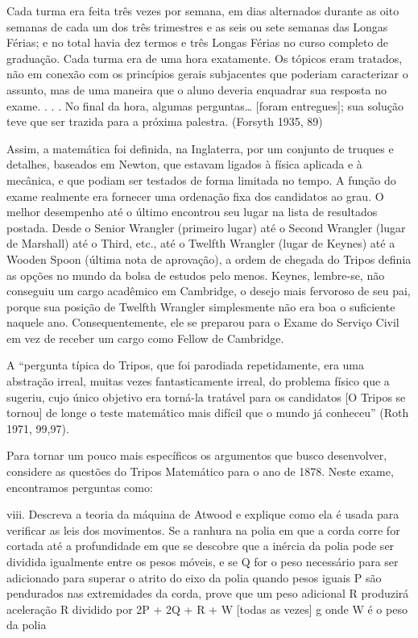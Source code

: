 \documentclass[a4paper,12pt]{article}[abntex2]
\begin{document}
Cada turma era feita três vezes por semana, em dias alternados durante as oito semanas de cada um dos três trimestres e as seis ou sete semanas das Longas Férias; e no total havia dez termos e três Longas Férias no curso completo de graduação. Cada turma era de uma hora exatamente. Os tópicos eram tratados, não em conexão com os princípios gerais subjacentes que poderiam caracterizar o assunto, mas de uma maneira que o aluno deveria enquadrar sua resposta no exame. . . . No final da hora, algumas perguntas… [foram entregues]; sua solução teve que ser trazida para a próxima palestra. (Forsyth 1935, 89)

Assim, a matemática foi definida, na Inglaterra, por um conjunto de truques e detalhes, baseados em Newton, que estavam ligados à física aplicada e à mecânica, e que podiam ser testados de forma limitada no tempo. A função do exame realmente era fornecer uma ordenação fixa dos candidatos ao grau. O melhor desempenho até o último encontrou seu lugar na lista de resultados postada. Desde o Senior Wrangler (primeiro lugar) até o Second Wrangler (lugar de Marshall) até o Third, etc., até o Twelfth Wrangler (lugar de Keynes) até a Wooden Spoon (última nota de aprovação), a ordem de chegada do Tripos definia as opções no mundo da bolsa de estudos pelo menos. Keynes, lembre-se, não conseguiu um cargo acadêmico em Cambridge, o desejo mais fervoroso de seu pai, porque sua posição de Twelfth Wrangler simplesmente não era boa o suficiente naquele ano. Consequentemente, ele se preparou para o Exame do Serviço Civil em vez de receber um cargo como Fellow de Cambridge.

A “pergunta típica do Tripos, que foi parodiada repetidamente, era uma abstração irreal, muitas vezes fantasticamente irreal, do problema físico que a sugeriu, cujo único objetivo era torná-la tratável para os candidatos [O Tripos se tornou] de longe o teste matemático mais difícil que o mundo já conheceu” (Roth 1971, 99,97).

Para tornar um pouco mais específicos os argumentos que busco desenvolver, considere as questões do Tripos Matemático para o ano de 1878. Neste exame, encontramos perguntas como:

viii. Descreva a teoria da máquina de Atwood e explique como ela é usada para verificar as leis dos movimentos. Se a ranhura na polia em que a corda corre for cortada até a profundidade em que se descobre que a inércia da polia pode ser dividida igualmente entre os pesos móveis, e se Q for o peso necessário para ser adicionado para superar o atrito do eixo da polia quando pesos iguais P são pendurados nas extremidades da corda, prove que um peso adicional R produzirá aceleração R dividido por 2P + 2Q + R + W [todas as vezes] g onde W é o peso da polia
\end{document}
